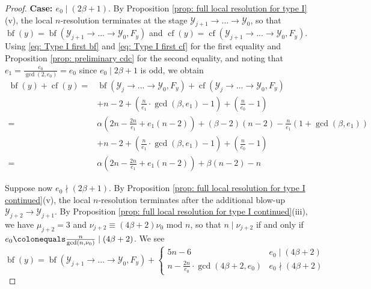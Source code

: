\documentclass[12pt]{amsart}
\numberwithin{equation}{section}
\theoremstyle{definition}
\newcommand{\Y}{\mathcal{Y}}
\newcommand{\tx}[1]{\text{#1}}
\DeclareMathOperator{\blf}{bf}
\DeclareMathOperator{\cf}{cf}
\begin{document}
\begin{proof}
    \textbf{Case: $e_0\mid(2\beta+1)$}. By Proposition \ref{prop: full local resolution for type I}(v), the local $n$-resolution terminates at the stage $\Y_{j+1}\to...\to\Y_0$, so that $\blf(y)=\blf(\Y_{j+1}\to...\to\Y_0,F_y)$ and $\cf(y)=\cf(\Y_{j+1}\to...\to\Y_0,F_y)$. Using \eqref{eq: Type I first bf} and \eqref{eq: Type I first cf} for the first equality and Proposition \ref{prop: preliminary cdc} for the second equality, and noting that $e_1=\frac{e_0}{\gcd(2,e_0)}=e_0$ since $e_0\mid 2\beta+1$ is odd, we obtain
    \begin{align*}
\blf(y)+\cf(y)=&\blf(\Y_j\to...\to\Y_0,F_y)+\cf(\Y_j\to...\to\Y_0,F_y)\\
        &+n-2+(\frac{n}{e_1}\cdot\gcd(\beta,e_1)-1)+(\frac{n}{e_0}-1)\\
        =&\alpha(2n-\frac{2n}{e_1}+e_1(n-2))+(\beta-2)(n-2)-\frac{n}{e_1}(1+\gcd(\beta,e_1))\\
        &+n-2+(\frac{n}{e_1}\cdot\gcd(\beta,e_1)-1)+(\frac{n}{e_0}-1)\\
        =&\alpha(2n-\frac{2n}{e_1}+e_1(n-2))+\beta(n-2)-n
    \end{align*}

    Suppose now $e_0\nmid(2\beta+1)$. By Proposition \ref{prop: full local resolution for type I continued}(v), the local $n$-resolution terminates after the additional blow-up $\Y_{j+2}\to\Y_{j+1}$. By Proposition \ref{prop: full local resolution for type I continued}(iii), we have $\mu_{j+2}=3$ and $\nu_{j+2}\equiv(4\beta+2)\nu_0\tx{ mod }n$, so that $n\mid\nu_{j+2}$ if and only if $e_0\colonequals\frac{n}{\gcd(n,\nu_0)}\mid(4\beta+2)$. We see %
    \begin{equation}\label{eq: Type I second bf}
    \blf(y)=\blf(\Y_{j+1}\to...\to\Y_0,F_y)+\begin{cases}
        5n-6& e_0\mid (4\beta+2)\\
        n-\frac{2n}{e_0}\cdot\gcd(4\beta+2,e_0)&e_0\nmid (4\beta+2)
    \end{cases}\end{equation}


\end{proof}
\end{document}
